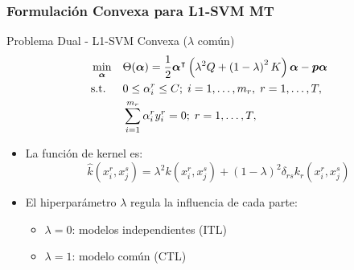 \documentclass[aspectratio=43]{beamer}
\newcommand{\upper}[1]{\expandafter\MakeUppercase\expandafter{#1}}
\newcommand{\mymat}[1]{\upper{#1}}
\newcommand{\myvec}[1]{\bm{#1}}
\newcommand{\fv}[1]{\myvec{#1}}
\newcommand{\fm}[1]{\mymat{#1}}
\newcommand{\ntasks}{T}
\newcommand{\npertask}{m}
\begin{document}
  \begin{frame}
      \frametitle{Formulación Convexa para L1-SVM MT}
  
      \begin{block}{Problema Dual - L1-SVM Convexa ($\lambda$ común)}
            \begin{equation}\nonumber
                  \begin{aligned}
                  & \min_{\fv{\alpha}} && \Theta(\fv{\alpha}) = \frac{1}{2} \fv{\alpha}^\intercal \left(\lambda^2 \fm{Q} + \left( 1 - \lambda \right)^2 \fm{K}  \right) \fv{\alpha} - \fv{p} \fv{\alpha} \\
                  & \text{s.t.}
                  & & 0 \leq \alpha_i^r \leq C ; \; i=1, \ldots, \npertask_r,\; r=1, \ldots, \ntasks ,\\
                  & & & \sum_{i=1}^{m_r} \alpha_i^r y_i^r = 0;\;  r=1, \ldots, \ntasks , \\
                  \end{aligned}
              \end{equation}
      \end{block}
      \begin{itemize}
            \item La función de kernel es: 
            $$     \widehat{k}({x}_i^r, {x}_j^s) = \lambda^2 k({x}_i^r, {x}_j^s) +   (1-\lambda)^2 \delta_{rs} k_r({x}_i^r, {x}_j^s) 
            $$
            \item El hiperparámetro $\lambda$ regula la influencia de cada parte:
            \begin{itemize}
                \item $\lambda=0$: modelos independientes (ITL)
                \item $\lambda=1$: modelo común (CTL)
            \end{itemize}
      \end{itemize}

  \end{frame}
\end{document}
